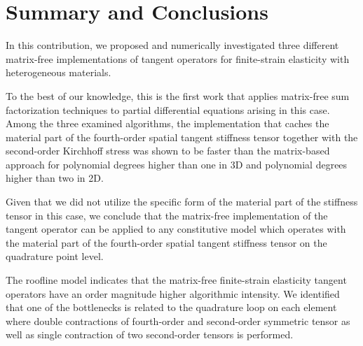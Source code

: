 \documentclass[times,doublespace]{nmeauth}
\newcommand{\changeDD}[1]{#1}
\newcommand{\changeJP}[1]{#1}
\begin{document}


\section{Summary and Conclusions}
\label{sec:summary}

In this contribution, we proposed and numerically investigated \changeDD{three different} matrix-free implementations of tangent operators for finite-strain elasticity with heterogeneous materials.
\changeDD{
To the best of our knowledge, this is the first work that applies matrix-free sum factorization techniques to partial differential equations arising in this case.}
\changeDD{Among the three \changeJP{examined} algorithms,}
the implementation that caches the material part of the fourth-order spatial tangent stiffness tensor together with the second-order Kirchhoff stress was shown to be faster than the matrix-based approach for polynomial degrees higher than one in 3D and polynomial degrees higher than two \changeDD{ in 2D}.
\changeDD{
Given that we did not utilize the specific form of the material part of the stiffness tensor in this case, we conclude}
that the matrix-free implementation of the tangent operator can be applied to any constitutive model which operates with the material part of the fourth-order spatial tangent stiffness tensor on the quadrature point level.

\changeDD{
The roofline model indicates that the matrix-free finite-strain elasticity tangent operators have an order magnitude higher algorithmic intensity.
We identified that one of the bottlenecks is related to the quadrature loop on each element where double contractions of fourth-order and second-order symmetric tensor
as well as single contraction of two second-order tensors is performed.
}
\end{document}
